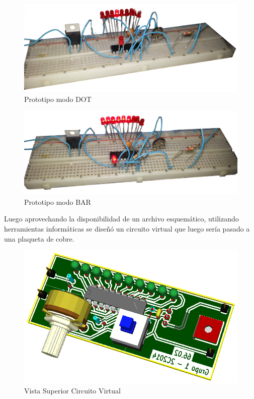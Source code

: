 \documentclass[12pt,a4paper]{article}
\begin{document}
			\begin{figure}[H]
			\centering
				\includegraphics[scale=0.1]{images/proto_dot.jpg}\caption{Prototipo modo DOT}
			\end{figure}

			\begin{figure}[H]
			\centering
				\includegraphics[scale=0.1]{images/proto_bar.jpg}\caption{Prototipo modo BAR}
			\end{figure}

			Luego aprovechando la disponibilidad de un archivo esquemático, utilizando herramientas informáticas se diseñó un circuito virtual que luego sería pasado a una plaqueta de cobre.

			\begin{figure}[H]
			\centering
				\includegraphics[scale=0.4]{images/virt_sup.png}\caption{Vista Superior Circuito Virtual}
			\end{figure}
\end{document}
